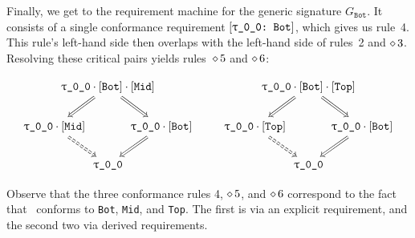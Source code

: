 \documentclass[../generics]{subfiles}
\begin{document}
\begin{example}
Finally, we get to the requirement machine for the generic signature $G_\texttt{Bot}$. It consists of a single conformance requirement $\ConfReq{\rT}{Bot}$, which gives us rule~4. This rule's left-hand side then overlaps with the left-hand side of rules~2 and $\diamond\, 3$. Resolving these critical pairs yields rules~$\diamond\, 5$ and $\diamond\, 6$:
\begin{ceqn}
\[
\begin{tikzcd}[column sep=-3em]
& \rT \cdot \protosym{Bot} \cdot \protosym{Mid}
\arrow[ld, Rightarrow]\arrow[rd, Rightarrow] \\
\rT \cdot \protosym{Mid} \arrow[rd, Rightarrow, dashed] && \rT \cdot \protosym{Bot} \arrow[ld, Rightarrow] \\
& \rT
\end{tikzcd}
\qquad
\begin{tikzcd}[column sep=-3em]
& \rT \cdot \protosym{Bot} \cdot \protosym{Top}
\arrow[ld, Rightarrow]\arrow[rd, Rightarrow] \\
\rT \cdot \protosym{Top} \arrow[rd, Rightarrow, dashed] && \rT \cdot \protosym{Bot} \arrow[ld, Rightarrow] \\
& \rT
\end{tikzcd}
\]
\end{ceqn}
Observe that the three conformance rules 4, $\diamond\, 5$, and $\diamond\, 6$ correspond to the fact that \rT\ conforms to \texttt{Bot}, \texttt{Mid}, and \texttt{Top}. The first is via an explicit requirement, and the second two via derived requirements.
\end{example}
\end{document}

